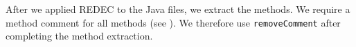\documentclass[%
class=scrreprt,
chapterprefix=false,%
open=right,%
twoside=false,%
paper=a4,%
logofile={Logo\_zentral\_farbig\_EN.png},%
thesistype=master,%
UKenglish,%
]{se2thesis}
\theoremstyle{definition}
\newcommand{\rdh}{REDEC\xspace}
\newcommand{\RDMs}{Readability Decreasing Modificatations\xspace}
\def\checkmark{\tikz\fill[scale=0.4](0,.35) -- (.25,0) -- (1,.7) -- (.25,.15) -- cycle;}
\begin{document}
	
	After we applied \rdh to the Java files, we extract the methods. We require a method comment for all methods (see ). We therefore use \texttt{removeComment} after completing the method extraction.
	
\end{document}
